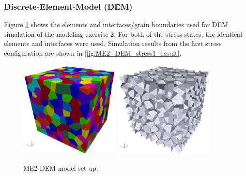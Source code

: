 \subsubsection*{Discrete-Element-Model (DEM)}
Figure \ref{fig:ME2_DEM_model_setup} shows the elements and interfaces/grain boundaries used for DEM simulation of the modeling exercise 2. For both of the stress states, the identical elements and interfaces were used. Simulation results from the first stress configuration are shown in \ref{fig:ME2_DEM_stress1_result}.

\begin{figure}[!ht]
\centering
\includegraphics[width=0.45\textwidth]{figures/ME2_DEM_model.pdf}
\includegraphics[width=0.45\textwidth]{figures/ME2_DEM_grain.pdf}
\caption{ME2 DEM model set-up.}
\label{fig:ME2_DEM_model_setup}
\end{figure}

